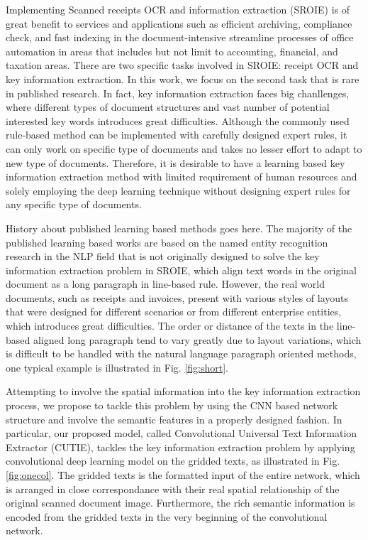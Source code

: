 \documentclass[10pt,twocolumn,letterpaper]{article}
\begin{document}
Implementing Scanned receipts OCR and information extraction (SROIE) is of great benefit to services and applications such as efficient archiving, compliance check, and fast indexing in the document-intensive streamline processes of office automation in areas that includes but not limit to accounting, financial, and taxation areas. There are two specific tasks involved in SROIE: receipt OCR and key information extraction. In this work, we focus on the second task that is rare in published research. In fact, key information extraction faces big chanllenges, where different types of document structures and vast number of potential interested key words introduces great difficulties. Although the commonly used rule-based method can be implemented with carefully designed expert rules, it can only work on specific type of documents and takes no lesser effort to adapt to new type of documents. Therefore, it is desirable to have a learning based key information extraction method with limited requirement of human resources and solely employing the deep learning technique without designing expert rules for any specific type of documents. 

History about published learning based methods goes here.
The majority of the published learning based works are based on the named entity recognition research in the NLP field that is not originally designed to solve the key information extraction problem in SROIE, which align text words in the original document as a long paragraph in line-based rule. However, the real world documents, such as receipts and invoices, present with various styles of layouts that were designed for different scenarios or from different enterprise entities, which introduces great difficulties. The order or distance of the texts in the line-based aligned long paragraph tend to vary greatly due to layout variations, which is difficult to be handled with the natural language paragraph oriented methods, one typical example is illustrated in Fig. \ref{fig:short}.

Attempting to involve the spatial information into the key information extraction process, we propose to tackle this problem by using the CNN based network structure and involve the semantic features in a properly designed fashion. In particular, our proposed model, called Convolutional Universal Text Information Extractor (CUTIE), tackles the key information extraction problem by applying convolutional deep learning model on the gridded texts, as illustrated in Fig. \ref{fig:onecol}. The gridded texts is the formatted input of the entire network, which is arranged in close correspondance with their real spatial relationship of the original scanned document image. Furthermore, the rich semantic information is encoded from the gridded texts in the very beginning of the convolutional network. 
\end{document}
